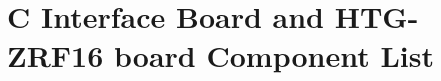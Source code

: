 \documentclass[12pt,a4paper,oneside]{article}
\begin{document}
\begin{landscape}
\begin{table}[H]
{\begin{tabular}{@{}lllllll@{}}
\bottomrule            
\end{tabular}}
\label{tab:Interface_components}
\end{table}

\newpage


\section*{C \hspace{.5cm} Interface Board and HTG-ZRF16 board Component List}


\begin{table}[H]
\centering
{}
\end{table}
\end{landscape}
\end{document}
